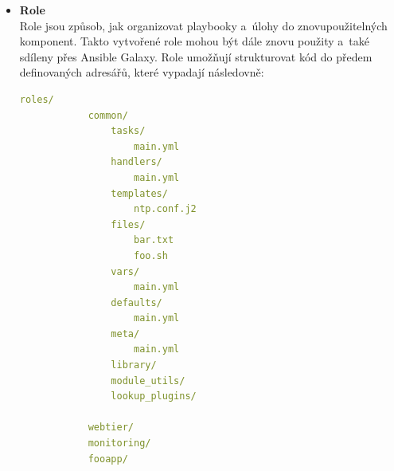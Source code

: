\begin{itemize}
    \begin{lstlisting}[language=YAML, caption={Ansible - ukázka YAML inventáře}, label={lst:ansibleyamlinventory}, captionpos=b]
    ungrouped:
        hosts:
            mail.example.com:
    webservers:
        hosts:
            foo.example.com:
            bar.example.com:
    dbservers:
        hosts:
            one.example.com:
            two.example.com:
            192.168.1.200:
    \end{lstlisting}

    Ansible definuje vždy 2 hlavní seskupení v~inventáři: 
    \begin{itemize}
        \item \texttt{all} - obsahuje všechny zařízení v~inventáři
        \item \texttt{ungrouped} - obsahuje zařízení, které nejsou přiřazeny do žádné skupiny
    \end{itemize}
    Všechny ostatní skupiny jsou definovány uživatelem a~mohou být hierarchicky organizovány, což umožňuje vytvářet podskupiny a~dědit vlastnosti mezi skupinami. \cite{ansibledocs}


    \item \textbf{Role} \\
    Role jsou způsob, jak organizovat playbooky a~úlohy do znovupoužitelných komponent.
    Takto vytvořené role mohou být dále znovu použity a~také sdíleny přes Ansible Galaxy.
    Role umožňují strukturovat kód do předem definovaných adresářů, které vypadají následovně:
    \clearpage
    \begin{lstlisting}[language=YAML, caption={Struktura adresářů pro Ansible role}, label={lst:ansiblerole}, captionpos=b]
        roles/
            common/
                tasks/
                    main.yml
                handlers/
                    main.yml 
                templates/
                    ntp.conf.j2
                files/
                    bar.txt
                    foo.sh
                vars/
                    main.yml
                defaults/
                    main.yml
                meta/
                    main.yml
                library/
                module_utils/
                lookup_plugins/

            webtier/
            monitoring/
            fooapp/
    \end{lstlisting} 


\end{itemize}

